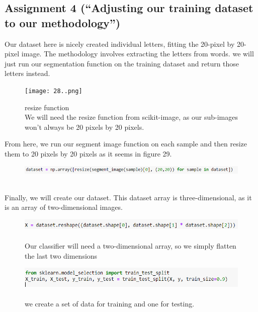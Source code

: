 \documentclass[onecolumn]{article}
\begin{document}
\newpage
\subsection{Assignment 4 (``Adjusting our training dataset to our methodology'')}

Our dataset here is nicely created individual letters, fitting the 20-pixel by 20-pixel image.
The methodology involves extracting the letters from words. we will just run our segmentation function on the training dataset and return those letters instead.

\begin{figure}[h]
    \centering
    \texttt{[image: 28..png]}
\caption{\label{fig:demo-bad}
\centering
resize function\\We will need the resize function from scikit-image, as our sub-images won't
always be 20 pixels by 20 pixels.}
\end{figure}

\begin{t}
From here, we run our segment image function on each sample and then resize
them to 20 pixels by 20 pixels as it seems in figure 29.
\end{t}

\begin{figure}[h]
    \centering
    \includegraphics[width=.9\linewidth]{29..png}
\caption{\label{fig:demo-bad}
\\}
\end{figure}

\begin{t}
Finally, we will create our dataset. This dataset array is three-dimensional, as it
is an array of two-dimensional images.
\end{t} 

\begin{figure}[h]
    \centering
    \includegraphics[width=.9\linewidth]{30..png}
\caption{\label{fig:demo-bad}
\centering
\\Our classifier will need a two-dimensional array, so we simply flatten the last two dimensions}
\end{figure}

\begin{figure}[hb!]
    \centering
    \includegraphics[width=.9\linewidth]{31..png}
\caption{\label{fig:demo-bad}
\centering
\\we create a set of data for training and one for testing.}
\end{figure}
\end{document}
